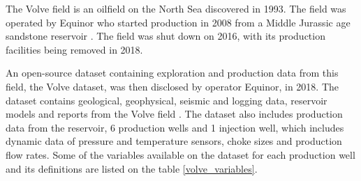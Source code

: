 \documentclass[conference]{IEEEtran}
\begin{document}
The Volve field is an oilfield on the North Sea discovered in 1993. The field was operated by Equinor who started production in 2008 from a Middle Jurassic age sandstone reservoir \cite{volve_info}. The field was shut down on 2016, with its production facilities being removed in 2018.

An open-source dataset containing exploration and production data from this field, the Volve dataset, was then disclosed by operator Equinor, in 2018. The dataset contains geological, geophysical, seismic and logging data, reservoir models and reports from the Volve field \cite{volve_data}. The dataset also includes production data from the reservoir, 6 production wells and 1 injection well, which includes dynamic data of pressure and temperature sensors, choke sizes and production flow rates. Some of the variables available on the dataset for each production well and its definitions are listed on the table \ref{volve_variables}.
\end{document}

